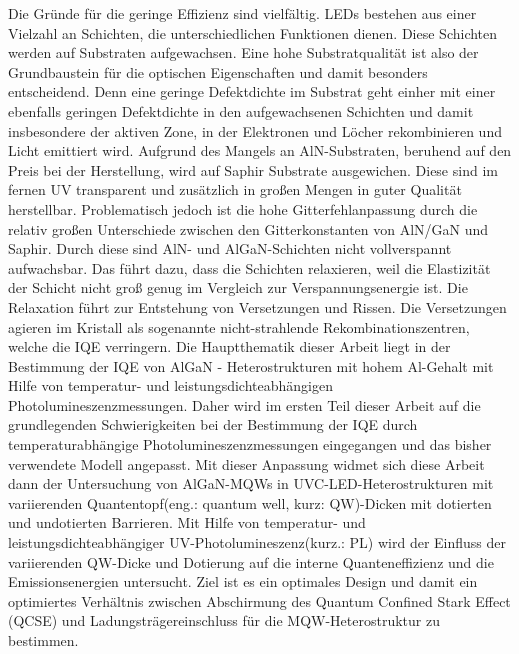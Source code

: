 Die Gründe für die geringe Effizienz sind vielfältig. LEDs bestehen aus einer Vielzahl an Schichten, die unterschiedlichen Funktionen dienen. Diese Schichten werden auf Substraten aufgewachsen. Eine hohe Substratqualität ist also der Grundbaustein für die optischen Eigenschaften und damit besonders entscheidend. Denn eine geringe Defektdichte im Substrat geht einher mit einer ebenfalls geringen Defektdichte in den aufgewachsenen Schichten und damit insbesondere der aktiven Zone, in der Elektronen und Löcher rekombinieren und Licht emittiert wird.
\newline
Aufgrund des Mangels an AlN-Substraten, beruhend auf den Preis bei der Herstellung, wird auf Saphir Substrate ausgewichen. Diese sind im fernen UV transparent und zusätzlich in großen Mengen in guter Qualität herstellbar. Problematisch jedoch ist die hohe Gitterfehlanpassung durch die relativ großen Unterschiede zwischen den Gitterkonstanten von AlN/GaN und Saphir. Durch diese sind AlN- und AlGaN-Schichten nicht vollverspannt aufwachsbar. Das führt dazu, dass die Schichten relaxieren, weil die Elastizität der Schicht nicht groß genug im Vergleich zur Verspannungsenergie ist. Die Relaxation führt zur Entstehung von Versetzungen und Rissen. Die Versetzungen agieren im Kristall als sogenannte nicht-strahlende Rekombinationszentren, welche die IQE verringern. 
\newline
Die Hauptthematik dieser Arbeit liegt in der Bestimmung der IQE von AlGaN - Heterostrukturen mit hohem Al-Gehalt mit Hilfe von temperatur- und leistungsdichteabhängigen Photolumineszenzmessungen.
Daher wird im ersten Teil dieser Arbeit auf die grundlegenden Schwierigkeiten bei der Bestimmung der IQE durch temperaturabhängige Photolumineszenzmessungen eingegangen und das bisher verwendete Modell angepasst. 
\newline
Mit dieser Anpassung widmet sich diese Arbeit dann der Untersuchung von AlGaN-MQWs in UVC-LED-Heterostrukturen mit variierenden Quantentopf(eng.: quantum well, kurz: QW)-Dicken mit dotierten und undotierten Barrieren. Mit Hilfe von temperatur- und leistungsdichteabhängiger UV-Photolumineszenz(kurz.: PL) wird der Einfluss der variierenden QW-Dicke und Dotierung auf die interne Quanteneffizienz und die Emissionsenergien untersucht. Ziel ist es ein optimales Design und damit ein optimiertes Verhältnis zwischen Abschirmung des Quantum Confined Stark Effect (QCSE) und Ladungsträgereinschluss für die MQW-Heterostruktur zu bestimmen.
\newline
